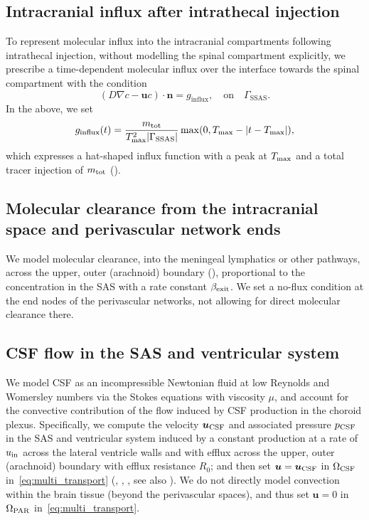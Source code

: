 \documentclass[fleqn,10pt]{wlscirep}
\begin{document}
\subsection*{Intracranial influx after intrathecal injection}
To represent molecular influx into the intracranial compartments
following intrathecal injection, without modelling the spinal
compartment explicitly, we prescribe a time-dependent molecular influx
over the interface towards the spinal compartment with the condition
$$(D \nabla c - \bm u c ) \cdot \bm{n} = g_{\mathrm{influx}},  \quad \mathrm{on}  \quad \Gamma_{\mathrm{SSAS}}. $$ In the above, we set
\begin{equation}
  g_\mathrm{influx}(t) = \frac{m_{\rm tot}}{T_{\rm max}^2 |\Gamma_{\rm SSAS}|} \max(0, T_{\rm max} - |t - T_{\rm max}|), 
\end{equation}
which expresses a hat-shaped influx function with a peak at $T_{\rm max}$ and a total tracer injection of $m_{\rm tot}$ ().

\subsection*{Molecular clearance from the intracranial space and perivascular network ends}

We model molecular clearance, into the meningeal lymphatics or other
pathways, across the upper, outer (arachnoid) boundary
(), proportional to the concentration
in the SAS with a rate constant $\beta_{\rm exit}$. We set a no-flux
condition at the end nodes of the perivascular networks, not allowing
for direct molecular clearance there.

\subsection{CSF flow in the SAS and ventricular system}
\label{sec:csf_fluid_vel}

We model CSF as an incompressible Newtonian fluid at low Reynolds and
Womersley numbers via the Stokes equations with viscosity $\mu$, and
account for the convective contribution of the flow induced by CSF
production in the choroid plexus. Specifically, we compute the
velocity $\bm u_{\rm CSF}$ and associated pressure $p_{\rm CSF}$ in
the SAS and ventricular system induced by a constant production at a
rate of $u_{\rm in}$ across the lateral ventricle walls and with
efflux across the upper, outer (arachnoid) boundary with efflux
resistance $R_0$; and then set $\bm u = \bm u_{\rm CSF}$ in
$\Omega_{\rm CSF}$ in~\eqref{eq:multi_transport}
(, ,
, see also ). We do not
directly model convection within the brain tissue (beyond the
perivascular spaces), and thus set $\bm u = 0$ in $\Omega_{\rm PAR}$
in~\eqref{eq:multi_transport}.
\end{document}

